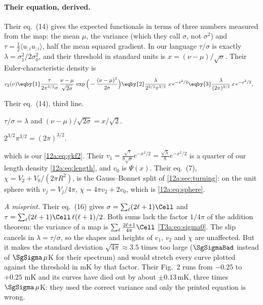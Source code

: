 \paragraph{Their equation, derived.} Their eq.~(14) gives the expected functionals in terms of three numbers
measured from the map: the mean $\mu$, the variance (which they call $\sigma$, not $\sigma^2$) and
$\tau=\frac12\langle u_{;i}u_{;i}\rangle$, half the mean squared gradient. In our language $\tau/\sigma$ is exactly
$\lambda=\sigma_1^2/2\sigma_0^2$, and their threshold in standard units is $x=(\nu-\mu)/\sqrt\sigma$. Their
Euler-characteristic density is
\begin{align}
  v_2(\nu)
  &\eqby{1}\frac{\tau}{2\pi^{3/2}\sigma}\,\frac{\nu-\mu}{\sqrt{2\sigma}}\,
     \exp\Big(-\frac{(\nu-\mu)^2}{2\sigma}\Big)
   \eqby{2}\frac{\lambda}{2^{3/2}\pi^{3/2}}\;x\,e^{-x^2/2}
   \eqby{3}\frac{\lambda}{(2\pi)^{3/2}}\,x\,e^{-x^2/2} ,
  \label{12a:eq:sg-v2}
\end{align}
\begin{explain}
  \item Their eq.~(14), third line.
  \item $\tau/\sigma=\lambda$ and $(\nu-\mu)/\sqrt{2\sigma}=x/\sqrt2$.
  \item $2^{3/2}\pi^{3/2}=(2\pi)^{3/2}$.
\end{explain}
which is our \eqref{12a:eq:gkf2}. Their $v_1=\frac{\sqrt\tau}{8\sqrt\sigma}e^{-x^2/2}=\frac{\sqrt\lambda}{8}e^{-x^2/2}$
is a quarter of our length density \eqref{12a:eq:length}, and $v_0$ is $\Psi(x)$. Their eq.~(7),
$\chi=V_2+V_0/(2\pi R^2)$, is the Gauss--Bonnet split of \cref{12a:sec:turning}: on the unit sphere with
$v_j=V_j/4\pi$, $\chi=4\pi v_2+2v_0$, which is \eqref{12a:eq:sphere}.

\emph{A misprint.} Their eq.~(16) gives $\sigma=\sum_\ell(2\ell+1)\Cell$ and
$\tau=\sum_\ell(2\ell+1)\Cell\,\ell(\ell+1)/2$. Both sums lack the factor $1/4\pi$ of the addition theorem: the
variance of a map is $\sum_\ell\frac{2\ell+1}{4\pi}\Cell$ \eqref{T3a:eq:sigma0}. The slip cancels in
$\lambda=\tau/\sigma$, so the shapes and heights of $v_1$, $v_2$ and $\chi$ are unaffected. But it makes the
standard deviation $\sqrt{4\pi}\approx3.5$ times too large ($\SgSigmaBad$ instead of $\SgSigma\,\mu$K for their
spectrum) and would stretch every curve plotted against the threshold in mK by that factor. Their Fig.~2 runs
from $-0.25$ to $+0.25$ mK and its curves have died out by about $\pm0.13$\,mK, three times $\SgSigma\,\mu$K: they
used the correct variance and only the printed equation is wrong.

